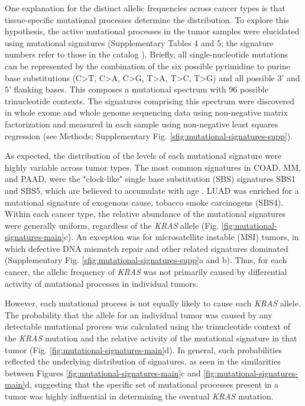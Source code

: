 \documentclass[english, 10pt, letterpaper]{article}
\newcommand{\KRAS}{\emph{KRAS}}
\begin{document}
One explanation for the distinct allelic frequencies across cancer types is that tissue-specific mutational processes determine the distribution.
To explore this hypothesis, the active mutational processes in the tumor samples were elucidated using mutational signatures \cite{Alexandrov2013} (Supplementary Tables 4 and 5; the signature numbers refer to those in the catalog \cite{Alexandrov2020TheCancer.}). 
Briefly, all single-nucleotide mutations can be represented by the combination of the six possible pyrimidine to purine base substitutions (C>T, C>A, C>G, T>A, T>C, T>G) and all possible 3’ and 5’ flanking bases. 
This composes a mutational spectrum with 96 possible trinucleotide contexts. 
The signatures comprising this spectrum were discovered in whole exome and whole genome sequencing data using non-negative matrix factorization and measured in each sample using non-negative least squares regression (see Methods; Supplementary Fig. \ref{sfig:mutational-signatures-supp}).

As expected, the distribution of the levels of each mutational signature were highly variable across tumor types.
The most common signatures in COAD, MM, and PAAD, were the "clock-like" single base substitution (SBS) signatures SBS1 and SBS5, which are believed to accumulate with age \cite{Alexandrov2015}. 
LUAD was enriched for a mutational signature of exogenous cause, tobacco smoke carcinogens (SBS4). 
Within each cancer type, the relative abundance of the mutational signatures were generally uniform, regardless of the \KRAS{} allele (Fig. \ref{fig:mutational-signatures-main}c). 
An exception was for microsatellite instable (MSI) tumors, in which defective DNA mismatch repair and other related signatures dominated (Supplementary Fig. \ref{sfig:mutational-signatures-supp}a and b).
Thus, for each cancer, the allelic frequency of \KRAS{} was not primarily caused by differential activity of mutational processes in individual tumors.

However, each mutational process is not equally likely to cause each \KRAS{} allele.
The probability that the allele for an individual tumor was caused by any detectable mutational process was calculated using the trinucleotide context of the \KRAS{} mutation and the relative activity of the mutational signature in that tumor (Fig. \ref{fig:mutational-signatures-main}d).
In general, such probabilities reflected the underlying distribution of signatures, as seen in the similarities between Figures \ref{fig:mutational-signatures-main}c and \ref{fig:mutational-signatures-main}d, suggesting that the specific set of mutational processes present in a tumor was highly influential in determining the eventual \KRAS{} mutation.
\end{document}
